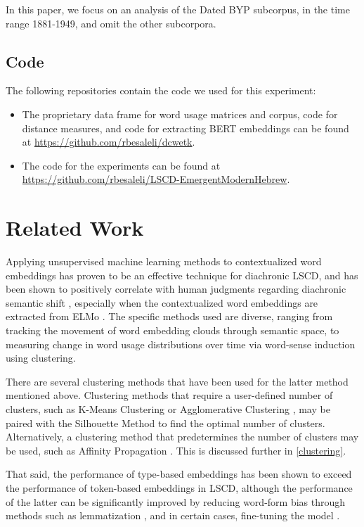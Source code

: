 \documentclass[10pt, a4paper]{article}
\begin{document}
In this paper, we focus on an analysis of the Dated BYP subcorpus, in the time range 1881-1949, and omit the other subcorpora.
\subsection{Code}
The following repositories contain the code we used for this experiment:
\begin{itemize}
    \item The proprietary data frame for word usage matrices and corpus, code for distance measures, and code for extracting BERT embeddings can be found at \href{https://github.com/rbesaleli/dcwetk}{https://github.com/rbesaleli/dcwetk}.
    \item The code for the experiments can be found at \href{https://github.com/rbesaleli/LSCD-EmergentModernHebrew}{https://github.com/rbesaleli/LSCD-EmergentModernHebrew}.
\end{itemize}
\section{Related Work}
Applying unsupervised machine learning methods to contextualized word embeddings has proven to be an effective technique for diachronic LSCD, and has been shown to positively correlate with human judgments regarding diachronic semantic shift \cite{Giulianelli2020,Kutuzov2020}, especially when the contextualized word embeddings are extracted from ELMo \cite{Kutuzov2020}. The specific methods used are diverse, ranging from tracking the movement of word embedding clouds through semantic space, to measuring change in word usage distributions over time via word-sense induction using clustering.

There are several clustering methods that have been used for the latter method mentioned above. Clustering methods that require a user-defined number of clusters, such as K-Means Clustering  \cite{Giulianelli2020} or Agglomerative Clustering \cite{Laicher2021}, may be paired with the Silhouette Method to find the optimal number of clusters. Alternatively, a clustering method that predetermines the number of clusters may be used, such as Affinity Propagation \cite{Martinc2020,Kutuzov2020}. This is discussed further in \ref{clustering}.

That said, the performance of type-based embeddings has been shown to exceed the performance of token-based embeddings in LSCD, although the performance of the latter can be significantly improved by reducing word-form bias through methods such as lemmatization \cite{Laicher2021}, and in certain cases, fine-tuning the model \cite{Martinc2020}. 
\end{document}
